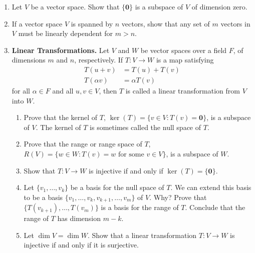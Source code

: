 {\begin{enumerate}
\item
Let $V$ be a vector space. Show that $\{ {\mathbf 0} \}$ is a subspace
of $V$ of dimension zero.


\item
If a vector space $V$ is spanned by $n$ vectors, show that any set of
$m$ vectors in $V$ must be linearly dependent for $m >n$.  


\item \label{vect:linear_transformation}
{\bf Linear Transformations.}
Let $V$ and $W$ be vector spaces over a field $F$, of dimensions $m$
and $n$, respectively. If $T: V \rightarrow W$ is a map satisfying
\begin{align*}
T( u+ v ) & =  T(u ) + T(v) \\
T( \alpha v ) & =  \alpha T(v)
\end{align*}
for all $\alpha \in F$ and all $u, v \in V$, then $T$ is called a
{\bfi linear transformation\/} from $V$ into $W$. 
\begin{enumerate}

   \item
Prove that the {\bfi kernel\/} of $T$, 
$\ker(T) = \{ v \in V : T(v) = 
{\mathbf 0} \}$, is a subspace of $V$. The kernel of $T$ is sometimes
called the {\bfi null space\/} of $T$. 

   \item
Prove that the {\bfi range\/} or
{\bfi range space\/} of $T$, $R(V) = \{ w \in W : T(v) = w \mbox{ for
some $v \in V$} \}$, is a subspace of $W$. 

   \item
Show that $T : V \rightarrow W$ is injective if and only if 
$\ker(T) = \{ \mathbf 0 \}$.

   \item
Let $\{ v_1, \ldots, v_k \}$ be a basis for the null space of $T$. We
can extend this basis to be a basis $\{ v_1, \ldots, v_k, v_{k+1},
\ldots, v_m\}$ of $V$. Why?  Prove that $\{ T(v_{k+1}), \ldots, T(v_m)
\}$ is a basis for the range of $T$. Conclude that the range of $T$
has dimension $m-k$.

   \item
Let $\dim V = \dim W$.  Show that a linear transformation $T : V
\rightarrow W$ is injective if and only if it is surjective.


\end{enumerate}
\end{enumerate}}
